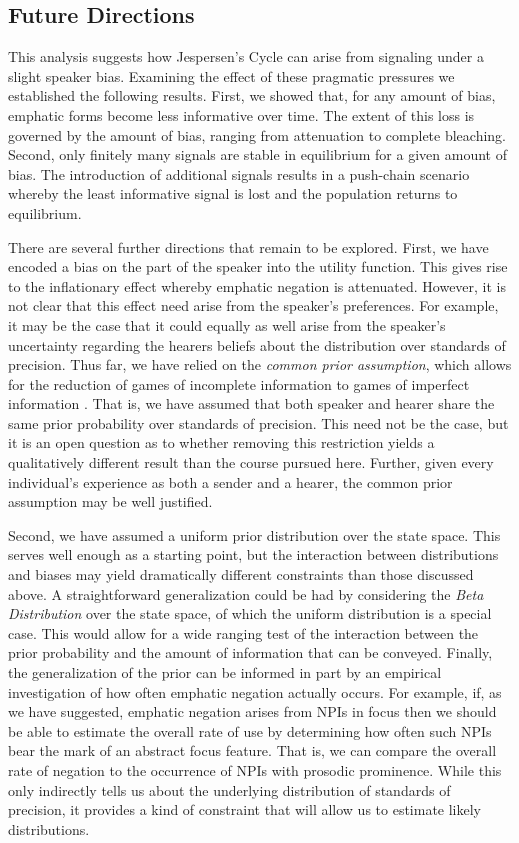 \documentclass[12pt]{article}
\theoremstyle{definition} \newtheorem{definition}{Definition}
\begin{document}
\subsection{Future Directions}

This analysis suggests how Jespersen's Cycle can arise from signaling under a slight speaker bias. Examining the effect of these pragmatic pressures we established the following results. First, we showed that, for any amount of bias, emphatic forms become less informative over time. The extent of this loss is governed by the amount of bias, ranging from attenuation to complete bleaching. Second, only finitely many signals are stable in equilibrium for a given amount of bias.  The introduction of additional signals results in a push-chain scenario whereby the least informative signal is lost and the population returns to equilibrium. 

There are several further directions that remain to be explored. First, we have encoded a bias on the part of the speaker into the utility function. This gives rise to the inflationary effect whereby emphatic negation is attenuated. However, it is not clear that this effect need arise from the speaker's preferences. For example, it may be the case that it could equally as well arise from the speaker's uncertainty regarding the hearers beliefs about the distribution over standards of precision. Thus far, we have relied on the \emph{common prior assumption}, which allows for the reduction of games of incomplete information to games of imperfect information \citep{harsanyi:1967,harsanyi:1968a,harsanyi:1968b}. That is, we have assumed that both speaker and hearer share the same prior probability over standards of precision. This need not be the case, but it is an open question as to whether removing this restriction yields a qualitatively different result than the course pursued here. Further, given every 
individual's experience as both a sender and a hearer, the common prior assumption may be well justified.

Second, we have assumed a uniform prior distribution over the state space. This serves well enough as a starting point, but the interaction between distributions and biases may yield dramatically different constraints than those discussed above. A straightforward generalization could be had by considering the \emph{Beta Distribution} over the state space, of which the uniform distribution is a special case. This would allow for a wide ranging test of the interaction between the prior probability and the amount of information that can be conveyed. Finally, the generalization of the prior can be informed in part by an empirical investigation of how often emphatic negation actually occurs. For example, if, as we have suggested, emphatic negation arises from NPIs in focus then we should be able to estimate the overall rate of use by determining how often such NPIs bear the mark of an abstract focus feature. That is, we can compare the overall rate of negation to the occurrence of NPIs with prosodic prominence.  
While this only indirectly tells us about the underlying distribution of standards of precision, it provides a kind of constraint that will allow us to estimate likely distributions.
\end{document}
